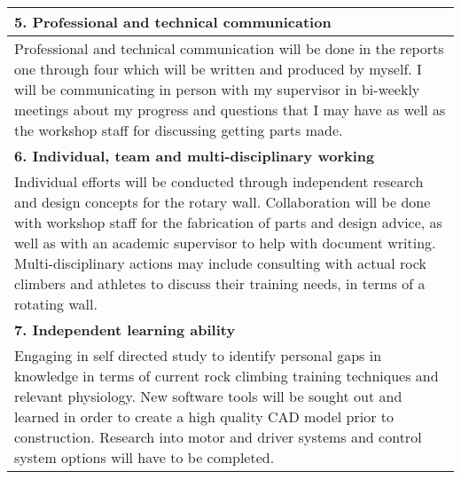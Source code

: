 {\begin{longtable}{|p{\dimexpr \linewidth-2\tabcolsep-2\arrayrulewidth}|}
\hline
\textbf{5. Professional and technical communication}%
\\
\hline

Professional and technical communication will be done in the reports one through four which will be written and produced by myself. I will be communicating in person with my supervisor in bi-weekly meetings about my progress and questions that I may have as well as the workshop staff for discussing getting parts made.
\\[1ex]


\hline
\textbf{6. Individual, team and multi-disciplinary working}%
\\
\hline
Individual efforts will be  conducted through independent research and design concepts for the rotary wall. Collaboration will be done with workshop staff for the fabrication of parts and design advice, as well as with an academic supervisor to help with document writing. Multi-disciplinary actions may include consulting with actual rock climbers and athletes to discuss their training needs, in terms of a rotating wall.
\\[1ex]

\hline
\textbf{7. Independent learning ability}%
\\
\hline
Engaging in self directed study to identify personal gaps in knowledge in terms of current rock climbing training techniques and relevant physiology. New software tools will be sought out and learned in order to create a high quality CAD model prior to construction. Research into motor and driver systems and  control system options will have to be completed.
\\[1ex]

\hline
\end{longtable}

}